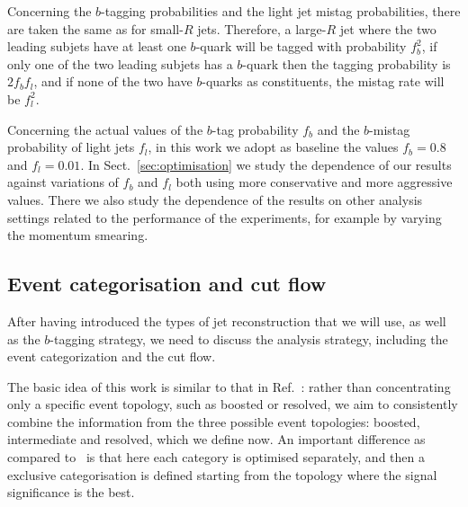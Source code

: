 \begin{itemize}
    Concerning the $b$-tagging probabilities and the
    light jet mistag probabilities, there are taken
    the same as for small-$R$ jets.
    Therefore, a large-$R$ jet where the two leading
    subjets have at least one $b$-quark will be tagged
    with probability $f_b^2$, if only one of the two leading
    subjets has a $b$-quark then the tagging probability is
    $2f_bf_l$, and if none of the two have $b$-quarks
    as constituents, the mistag rate will be
    $f_l^2$.


\end{itemize}

Concerning the actual values of the $b$-tag probability $f_b$ and
the $b$-mistag probability of light jets $f_l$, in this work
we adopt as baseline the values $f_b=0.8$ and $f_l=0.01$.
%
In Sect.~\ref{sec:optimisation} we study the dependence of
our results against variations of $f_b$ and $f_l$ both
using more conservative and more aggressive values.
%
There we also study the dependence of the results
on other analysis settings related to the performance of
the experiments, for example by varying the momentum smearing.

\subsection{Event categorisation and cut flow}

After having introduced the types of jet reconstruction
that we will use, as well as the $b$-tagging strategy,
we need to discuss the analysis strategy, including
the event categorization and the cut flow.

The basic idea of this work is similar to that in Ref.~\cite{Gouzevitch:2013qca}:
rather than concentrating only a specific event topology, such as boosted
or resolved, we aim to consistently combine the information from
the three possible event topologies: boosted, intermediate and
resolved, which we define now.
%
An important difference as compared to~\cite{Gouzevitch:2013qca}
is that here each category is optimised separately, and then
a exclusive categorisation is defined starting from the topology
where the signal significance is the best.

